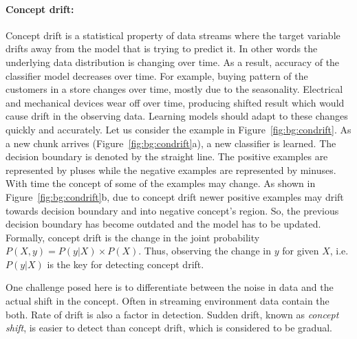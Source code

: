 \paragraph{Concept drift:}
Concept drift is a statistical property of data streams where the target variable drifts away from the model that is trying to predict it. In other words the underlying data distribution is changing over time. As a result, accuracy of the classifier model decreases over time. For example, buying pattern of the customers in a store changes over time, mostly due to the seasonality. Electrical and mechanical devices wear off over time, producing shifted result which would cause drift in the observing data. Learning models should adapt to these changes quickly and accurately. Let us consider the example in Figure~\ref{fig:bg:condrift}. As a new chunk arrives (Figure~\ref{fig:bg:condrift}a), a new classifier is learned. The decision boundary is denoted by the straight line. The positive examples are represented by pluses while the negative examples are represented by minuses. With time the concept of some of the examples may change. As shown in Figure~\ref{fig:bg:condrift}b, due to concept drift newer positive examples may drift towards decision boundary and into negative concept's region. So, the previous decision boundary has become outdated and the model has to be updated. Formally, concept drift is the change in the joint probability \(P(X, y) = P(y|X) \times P(X)\). Thus, observing the change in $y$ for given $X$, i.e. $P(y|X)$ is the key for detecting concept drift.

One challenge posed here is to differentiate between the noise in data and the actual shift in the concept. Often in streaming environment data contain the both. Rate of drift is also a factor in detection. Sudden drift, known as {\it concept shift}, is easier to detect than concept drift, which is considered to be gradual.

